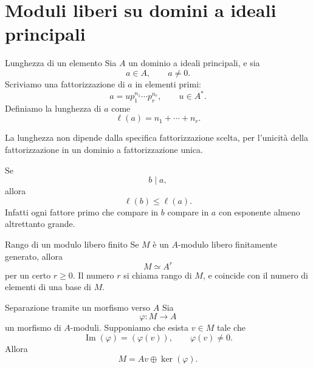 \documentclass[a4paper]{article}
\begin{document}
\section{Moduli liberi su domini a ideali principali}

\begin{radioactive}
\begin{snippetdefinition}{Lunghezza di un elemento}
    Sia \(A\) un dominio a ideali principali, e sia
    \[
        a\in A,
        \qquad
        a\neq 0.
    \]
    Scriviamo una fattorizzazione di \(a\) in elementi primi:
    \[
        a=u p_1^{n_1}\cdots p_r^{n_r},
        \qquad
        u\in A^\ast.
    \]
    Definiamo la lunghezza di \(a\) come
    \[
        \ell(a)=n_1+\cdots+n_r.
    \]
\end{snippetdefinition}
\end{radioactive}

\begin{radioactive}
La lunghezza non dipende dalla specifica fattorizzazione scelta, per l'unicità della fattorizzazione in un dominio a fattorizzazione unica.
\end{radioactive}

\begin{radioactive}
\begin{snippetremark}{}
    Se
    \[
        b\mid a,
    \]
    allora
    \[
        \ell(b)\leq \ell(a).
    \]
    Infatti ogni fattore primo che compare in \(b\) compare in \(a\) con esponente almeno altrettanto grande.
\end{snippetremark}
\end{radioactive}

\begin{radioactive}
\begin{snippetremark}{Rango di un modulo libero finito}
    Se \(M\) è un \(A\)-modulo libero finitamente generato, allora
    \[
        M\simeq A^r
    \]
    per un certo \(r\geq 0\). Il numero \(r\) si chiama rango di \(M\), e coincide con il numero di elementi di una base di \(M\).
\end{snippetremark}
\end{radioactive}

\begin{radioactive}
\begin{snippetlemma}{Separazione tramite un morfismo verso \(A\)}
    Sia
    \[
        \varphi\colon M\to A
    \]
    un morfismo di \(A\)-moduli. Supponiamo che esista \(v\in M\) tale che
    \[
        \operatorname{Im}(\varphi)=(\varphi(v)),
        \qquad
        \varphi(v)\neq 0.
    \]
    Allora
    \[
        M=Av\oplus\ker(\varphi).
    \]
\end{snippetlemma}
\end{radioactive}
\end{document}
